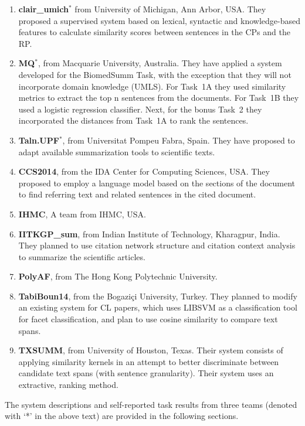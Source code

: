 \documentclass[11pt]{article}
\begin{document}
\begin{enumerate}
\item{{\bf clair\_umich$^{*}$} from University of Michigan, Ann Arbor, USA. They proposed a supervised system based on lexical, syntactic and knowledge-based features to calculate similarity scores between sentences in the CPs and the RP.}
\vspace{-.3cm}
\item{{\bf MQ$^{*}$}, from Macquarie University, Australia. They have applied a system developed for the BiomedSumm Task,
  with the exception that they will not incorporate domain knowledge (UMLS). For Task~1A they used similarity metrics to extract the top n sentences from the documents. For Task~1B they used a logistic regression classifier. Next, for the bonus Task~2 they incorporated the distances from Task~1A to rank the sentences.}
\vspace{-.3cm}
\item{{\bf Taln.UPF$^{*}$}, from Universitat Pompeu Fabra, Spain. They have proposed to adapt available summarization tools to scientific texts.}
\vspace{-.3cm}
\item{{\bf CCS2014}, from the IDA Center for Computing Sciences, USA. They proposed to employ a language model based on the sections of the document to find referring text and related sentences in the cited document.}
\vspace{-.3cm}
\item{{\bf IHMC}, A team from IHMC, USA.}
\vspace{-.3cm}
\item{{\bf IITKGP\_sum}, from Indian Institute of Technology, Kharagpur, India. They planned to use citation network structure and
  citation context analysis to summarize the scientific articles.}
\vspace{-.3cm}
\item{{\bf PolyAF}, from The Hong Kong Polytechnic University.}
\vspace{-.3cm}
\item{{\bf TabiBoun14}, from the Bogaziçi University, Turkey. They planned to modify an existing system for CL papers, which uses LIBSVM as a classification tool for facet classification, and plan to use cosine similarity to compare text spans.}
\vspace{-.3cm}
\item{{\bf TXSUMM}, from University of Houston, Texas. Their system consists of applying similarity kernels in an attempt to better
  discriminate between candidate text spans (with sentence granularity). Their system uses an extractive, ranking method.}
\end{enumerate}
The system descriptions and self-reported task results from three teams (denoted with `*' in the above text) are provided in the following sections. 
\end{document}
